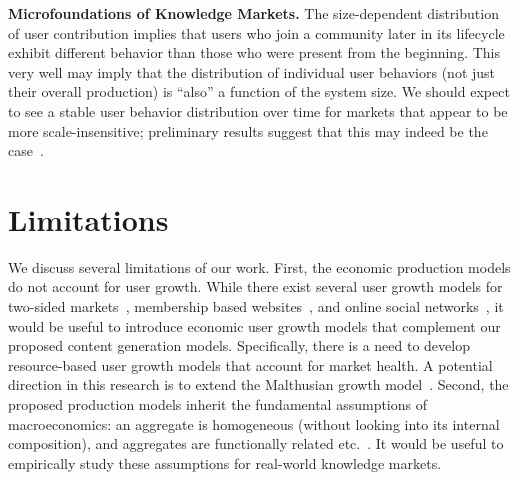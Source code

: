 \textbf{Microfoundations of Knowledge Markets.}
The size-dependent distribution of user contribution implies that users who join a community later in its lifecycle exhibit different behavior than those who were present from the beginning. This very well may imply that the distribution of individual user behaviors (not just their overall production) is ``also'' a function of the system size. We should expect to see a stable user behavior distribution over time for markets that appear to be more scale-insensitive; preliminary results suggest that this may indeed be the case~\cite{geigle2017}.

\section{Limitations}
We discuss several limitations of our work. First, the economic production models do not account for user growth. While there exist several user growth models for two-sided markets~\cite{Kumar2010}, membership based websites~\cite{Ribeiro2014}, and online social networks~\cite{Backstrom2006, kairam2012, zang2016}, it would be useful to introduce economic user growth models that complement our proposed content generation models. Specifically, there is a need to develop resource-based user growth models that account for market health. A potential direction in this research is to extend the Malthusian growth model~\cite{malthus1809}. Second, the proposed production models inherit the fundamental assumptions of macroeconomics: an aggregate is homogeneous (without looking into its internal composition), and aggregates are functionally related etc.~\cite{sims1980}. It would be useful to empirically study these assumptions for real-world knowledge markets.




